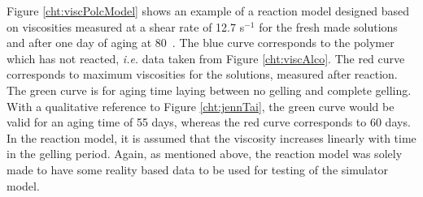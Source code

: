 \documentclass[nanomaterials,article,submit,moreauthors,pdftex]{Definitions/mdpi}
\begin{document}
Figure \ref{cht:viscPolcModel} shows an example of a reaction model designed based on viscosities measured at a shear rate of 12.7 s$^{-1}$ for the fresh made solutions and after one day of aging at 80~\celsius. The blue curve corresponds to the polymer which has not reacted, \textit{i.e.} data taken from Figure \ref{cht:viscAlco}. The red curve corresponds to maximum viscosities for the solutions, measured after reaction. The green curve is for aging time laying between no gelling and complete gelling. With a qualitative reference to Figure \ref{cht:jennTai}, the green curve would be valid for an aging time of 55 days, whereas the red curve corresponds to 60 days. In the reaction model, it is assumed that the viscosity increases linearly with time in the gelling period. Again, as mentioned above, the reaction model was solely made to have some reality based data to be used for testing of the simulator model. 
\end{document}
